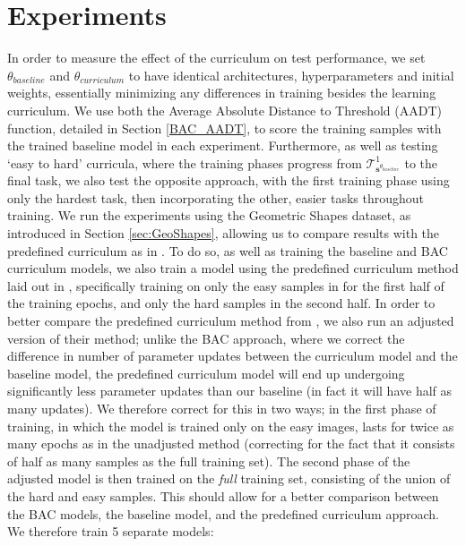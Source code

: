 \section{Experiments}
 In order to measure the effect of the curriculum on test performance, we set $\theta_{baseline}$ and $\theta_{curriculum}$ to have identical architectures, hyperparameters and initial weights, essentially minimizing any differences in training besides the learning curriculum. We use both the Average Absolute Distance to Threshold (AADT) function, detailed in Section \ref{BAC_AADT}, to score the training samples with the trained baseline model in each experiment. Furthermore, as well as testing `easy to hard' curricula, where the training phases progress from  $\mathcal{T}^1_{\mathbf{s}^{\theta_{baseline}}}$ to the final task, we also test the opposite approach, with the first training phase using only the hardest task, then incorporating the other, easier tasks throughout training. We run the experiments using the Geometric Shapes dataset, as introduced in Section \ref{sec:GeoShapes}, allowing us to compare results with the predefined curriculum as in \cite{Bengio2009}. To do so, as well as training the baseline and BAC curriculum models, we also train a model using the predefined curriculum method laid out in \cite{Bengio2009}, specifically training on only the easy samples in for the first half of the training epochs, and only the hard samples in the second half. In order to better compare the predefined curriculum method from \cite{Bengio2009}, we also run an adjusted version of their method; unlike the BAC approach, where we correct the difference in number of parameter updates between the curriculum model and the baseline model, the predefined curriculum model will end up undergoing significantly less parameter updates than our baseline (in fact it will have half as many updates). We therefore correct for this in two ways; in the first phase of training, in which the model is trained only on the easy images, lasts for twice as many epochs as in the unadjusted method (correcting for the fact that it consists of half as many samples as the full training set). The second phase of the adjusted model is then trained on the \textit{full} training set, consisting of the union of the hard and easy samples. This should allow for a better comparison between the BAC models, the baseline model, and the predefined curriculum approach. We therefore train 5 separate models:
